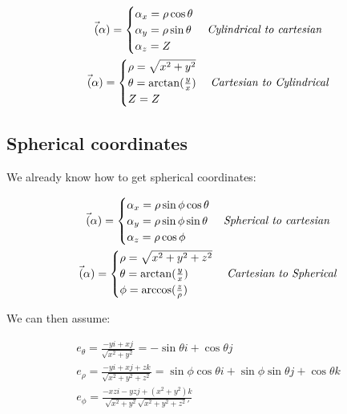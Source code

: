 \documentclass[11pt,fleqn]{book} %
\begin{document}
\begin{gather}
    \vec(\alpha) =
    \begin{cases}
        \alpha_x = \rho \cos \theta \\
        \alpha_y = \rho \sin \theta \\
        \alpha_z = Z
    \end{cases}
    \text{\textit{Cylindrical to cartesian}}
    \\
    \vec(\alpha) =
    \begin{cases}
        \rho = \sqrt{x^2 + y^2} \\
        \theta =  \arctan(\frac{y}{x}) \\
        Z = Z
    \end{cases}
    \text{\textit{Cartesian to Cylindrical}}
\end{gather}

\subsection{Spherical coordinates}

We already know how to get spherical coordinates:


\begin{gather}
    \vec(\alpha) =
    \begin{cases}
        \alpha_x = \rho \sin \phi \cos \theta \\
        \alpha_y = \rho \sin \phi \sin \theta \\
        \alpha_z = \rho \cos \phi
    \end{cases}
    \text{\textit{Spherical to cartesian}} \\ 
    \vec(\alpha) =
    \begin{cases}
        \rho = \sqrt{x^2 + y^2 + z^2} \\
        \theta =  \arctan(\frac{y}{x}) \\
        \phi = \arccos(\frac{z}{\rho})
    \end{cases}
    \text{\textit{Cartesian to Spherical}}
\end{gather}

We can then assume:

\begin{gather}
    e_\theta = \frac{-yi + xj}{\sqrt{x^2+y^2}} = -\sin \theta i + \cos \theta j\\
    e_\rho = \frac{-yi + xj + zk}{\sqrt{x^2+y^2+z^2}} = \sin \phi \cos \theta i + \sin \phi \sin \theta j + \cos \theta k \\
    e_\phi = \frac{-xz i - yz j + (x^2+y^2)k}{\sqrt{x^2+y^2} \sqrt{x^2+y^2+z^2}'} 
\end{gather}
\end{document}

